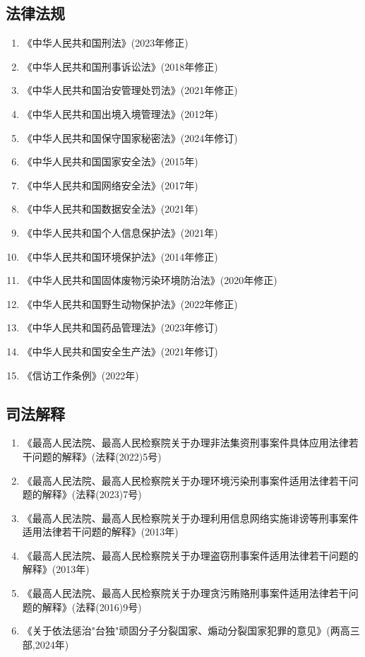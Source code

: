 \documentclass[12pt,a4paper]{article}
\begin{document}
\subsection{法律法规}
\begin{enumerate}
  \item 《中华人民共和国刑法》(2023年修正)
  \item 《中华人民共和国刑事诉讼法》(2018年修正)
  \item 《中华人民共和国治安管理处罚法》(2021年修正)
  \item 《中华人民共和国出境入境管理法》(2012年)
  \item 《中华人民共和国保守国家秘密法》(2024年修订)
  \item 《中华人民共和国国家安全法》(2015年)
  \item 《中华人民共和国网络安全法》(2017年)
  \item 《中华人民共和国数据安全法》(2021年)
  \item 《中华人民共和国个人信息保护法》(2021年)
  \item 《中华人民共和国环境保护法》(2014年修正)
  \item 《中华人民共和国固体废物污染环境防治法》(2020年修正)
  \item 《中华人民共和国野生动物保护法》(2022年修正)
  \item 《中华人民共和国药品管理法》(2023年修订)
  \item 《中华人民共和国安全生产法》(2021年修订)
  \item 《信访工作条例》(2022年)
\end{enumerate}

\subsection{司法解释}
\begin{enumerate}
  \item 《最高人民法院、最高人民检察院关于办理非法集资刑事案件具体应用法律若干问题的解释》(法释(2022)5号)
  \item 《最高人民法院、最高人民检察院关于办理环境污染刑事案件适用法律若干问题的解释》(法释(2023)7号)
  \item 《最高人民法院、最高人民检察院关于办理利用信息网络实施诽谤等刑事案件适用法律若干问题的解释》(2013年)
  \item 《最高人民法院、最高人民检察院关于办理盗窃刑事案件适用法律若干问题的解释》(2013年)
  \item 《最高人民法院、最高人民检察院关于办理贪污贿赂刑事案件适用法律若干问题的解释》(法释(2016)9号)
  \item 《关于依法惩治"台独"顽固分子分裂国家、煽动分裂国家犯罪的意见》(两高三部,2024年)
\end{enumerate}
\end{document}
